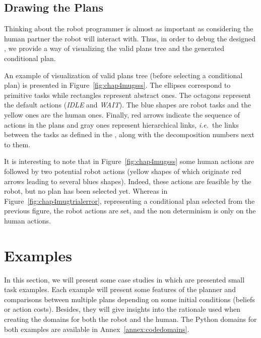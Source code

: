 \documentclass[a4paper,11pt,twoside]{StyleThese}
\begin{document}

\subsection{Drawing the Plans}
Thinking about the robot programmer is almost as important as considering the human partner the robot will interact with. Thus, in order to debug the designed , we provide a way of visualizing the valid plans tree and the generated conditional plan. 

An example of visualization of valid plans tree (before selecting a conditional plan) is presented in Figure~\ref{fig:chap4mugsss}. The ellipses correspond to primitive tasks while rectangles represent abstract ones. The octagons represent the default actions (\textit{IDLE} and \textit{WAIT}). The blue shapes are robot tasks and the yellow ones are the human ones. Finally, red arrows indicate the sequence of actions in the plans and gray ones represent hierarchical links, \textit{i.e.}~the links between the tasks as defined in the , along with the decomposition numbers next to them.

It is interesting to note that in Figure~\ref{fig:chap4mugsss} some human actions are followed by two potential robot actions (yellow shapes of which originate red arrows leading to several blues shapes). Indeed, these actions are feasible by the robot, but no plan has been selected yet. Whereas in Figure~\ref{fig:chap4mugtrialerror}, representing a conditional plan selected from the previous figure, the robot actions are set, and the non determinism is only on the human actions.

\section{Examples}
In this section, we will present some case studies in which are presented small task examples. Each example will present some features of the planner and comparisons between multiple plans depending on some initial conditions (beliefs or action costs). Besides, they will give insights into the rationale used when creating the domains for both the robot and the human. The Python domains for both examples are available in Annex~\ref{annex:codedomains}.
\end{document}
